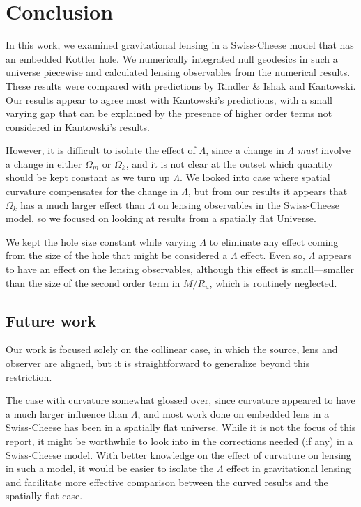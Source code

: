 \chapter{Conclusion}
\label{chapter:conclusion}

In this work, we examined gravitational lensing in a Swiss-Cheese model that has an embedded Kottler hole. We numerically integrated null geodesics in such a universe piecewise and calculated lensing observables from the numerical results. These results were compared with predictions by Rindler \& Ishak and Kantowski. Our results appear to agree most with Kantowski's predictions, with a small varying gap that can be explained by the presence of higher order terms not considered in Kantowski's results. 

However, it is difficult to isolate the effect of $\Lambda$, since a change in $\Lambda$ \emph{must} involve a change in either $\Omega_m$ or $\Omega_k$, and it is not clear at the outset which quantity should be kept constant as we turn up $\Lambda$. We looked into case where spatial curvature compensates for the change in $\Lambda$, but from our results it appears that $\Omega_k$ has a much larger effect than $\Lambda$ on lensing observables in the Swiss-Cheese model, so we focused on looking at results from a spatially flat Universe. 

We kept the hole size constant while varying $\Lambda$ to eliminate any effect coming from the size of the hole that might be considered a $\Lambda$ effect. Even so, $\Lambda$ appears to have an effect on the lensing observables, although this effect is small---smaller than the size of the second order term in $M/R_u$, which is routinely neglected. 

\section{Future work}

Our work is focused solely on the collinear case, in which the source, lens and observer are aligned, but it is straightforward to generalize beyond this restriction. 

The case with curvature somewhat glossed over, since curvature appeared to have a much larger influence than $\Lambda$, and most work done on embedded lens in a Swiss-Cheese has been in a spatially flat universe. While it is not the focus of this report, it might be worthwhile to look into in the corrections needed (if any) in a Swiss-Cheese model.  With better knowledge on the effect of curvature on lensing in such a model, it would be easier to isolate the $\Lambda$ effect in gravitational lensing and facilitate more effective comparison between the curved results and the spatially flat case. 


